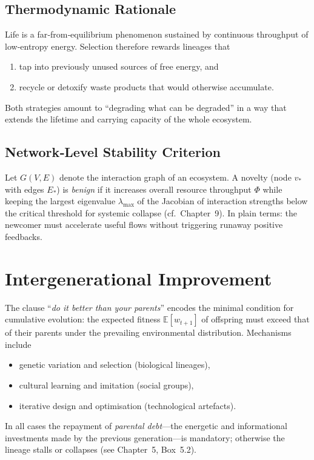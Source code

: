 \subsection*{Thermodynamic Rationale}
Life is a far‑from‑equilibrium phenomenon sustained by continuous throughput of low‑entropy energy.  Selection therefore rewards lineages that 
\begin{enumerate}
  \item tap into previously unused sources of free energy, and
  \item recycle or detoxify waste products that would otherwise accumulate.  
\end{enumerate}
Both strategies amount to “degrading what can be degraded” in a way that extends the lifetime and carrying capacity of the whole ecosystem.

\subsection*{Network‑Level Stability Criterion}
Let $G(V,E)$ denote the interaction graph of an ecosystem.  A novelty (node $v_*$ with edges $E_*$) is \emph{benign} if it increases overall resource throughput $\Phi$ while keeping the largest eigenvalue $\lambda_{\max}$ of the Jacobian of interaction strengths below the critical threshold for systemic collapse (cf.~Chapter~9).  In plain terms: the newcomer must accelerate useful flows without triggering runaway positive feedbacks.

\section*{Intergenerational Improvement}
The clause “\emph{do it better than your parents}” encodes the minimal condition for cumulative evolution: the expected fitness $\mathbb{E}[w_{t+1}]$ of offspring must exceed that of their parents under the prevailing environmental distribution.  Mechanisms include
\begin{itemize}
  \item genetic variation and selection (biological lineages),
  \item cultural learning and imitation (social groups),
  \item iterative design and optimisation (technological artefacts).
\end{itemize}
In all cases the repayment of \emph{parental debt}---the energetic and informational investments made by the previous generation---is mandatory; otherwise the lineage stalls or collapses (see Chapter~5, Box~5.2).

